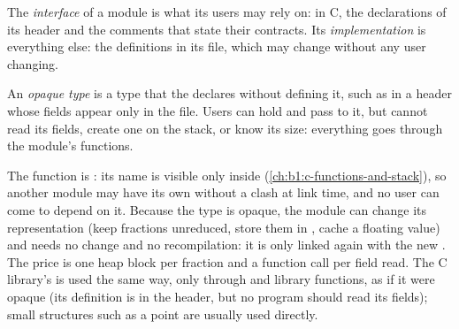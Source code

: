 \begin{definition}\label{def:b1:c-modules-make-tests:interface}
The \emph{interface} of a module is what its users may rely on: in C, the declarations of
its header and the comments that state their contracts. Its \emph{implementation}
is everything else: the definitions in its  file, which may change without any user changing.
\end{definition}

\label{lst:b1:c-modules-make-tests:ratio-h}

\begin{definition}\label{def:b1:c-modules-make-tests:opaque}
An \emph{opaque type} is a type that the  declares without defining it, such as
 in a header whose fields appear only in the  file. Users can hold and pass 
to it, but cannot read its fields, create one on the stack, or know its size: everything goes through the module's
functions.
\end{definition}

\label{lst:b1:c-modules-make-tests:ratio-c}

\label{lst:b1:c-modules-make-tests:demo}


The function  is : its name is visible only inside 
(\cref{ch:b1:c-functions-and-stack}), so another module may have its own  without a clash at link time, and
no user can come to depend on it. Because the type is opaque, the module can change its representation (keep fractions
unreduced, store them in , cache a floating value) and  needs no change and no
recompilation: it is only linked again with the new . The price is one heap block per fraction and a
function call per field read. The C library's  is used the same way, only through  and library
functions, as if it were opaque (its definition is in the header, but no program should read its fields); small
structures such as a point are usually used directly.

